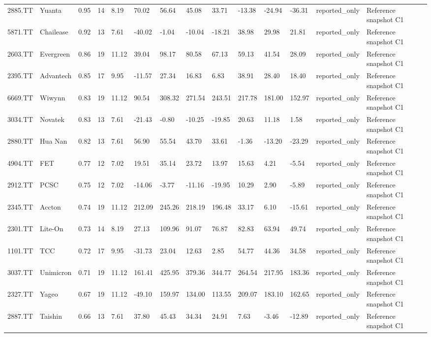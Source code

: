 \begin{landscape}
\begin{longtable}{llllllllllllll}
2885.TT & Yuanta & 0.95 & 14 & 8.19 & 70.02 & 56.64 & 45.08 & 33.71 & -13.38 & -24.94 & -36.31 & reported\_only & Reference snapshot C1 \\
5871.TT & Chailease & 0.92 & 13 & 7.61 & -40.02 & -1.04 & -10.04 & -18.21 & 38.98 & 29.98 & 21.81 & reported\_only & Reference snapshot C1 \\
2603.TT & Evergreen & 0.86 & 19 & 11.12 & 39.04 & 98.17 & 80.58 & 67.13 & 59.13 & 41.54 & 28.09 & reported\_only & Reference snapshot C1 \\
2395.TT & Advantech & 0.85 & 17 & 9.95 & -11.57 & 27.34 & 16.83 & 6.83 & 38.91 & 28.40 & 18.40 & reported\_only & Reference snapshot C1 \\
6669.TT & Wiwynn & 0.83 & 19 & 11.12 & 90.54 & 308.32 & 271.54 & 243.51 & 217.78 & 181.00 & 152.97 & reported\_only & Reference snapshot C1 \\
3034.TT & Novatek & 0.83 & 13 & 7.61 & -21.43 & -0.80 & -10.25 & -19.85 & 20.63 & 11.18 & 1.58 & reported\_only & Reference snapshot C1 \\
2880.TT & Hua Nan & 0.82 & 13 & 7.61 & 56.90 & 55.54 & 43.70 & 33.61 & -1.36 & -13.20 & -23.29 & reported\_only & Reference snapshot C1 \\
4904.TT & FET & 0.77 & 12 & 7.02 & 19.51 & 35.14 & 23.72 & 13.97 & 15.63 & 4.21 & -5.54 & reported\_only & Reference snapshot C1 \\
2912.TT & PCSC & 0.75 & 12 & 7.02 & -14.06 & -3.77 & -11.16 & -19.95 & 10.29 & 2.90 & -5.89 & reported\_only & Reference snapshot C1 \\
2345.TT & Accton & 0.74 & 19 & 11.12 & 212.09 & 245.26 & 218.19 & 196.48 & 33.17 & 6.10 & -15.61 & reported\_only & Reference snapshot C1 \\
2301.TT & Lite-On & 0.73 & 14 & 8.19 & 27.13 & 109.96 & 91.07 & 76.87 & 82.83 & 63.94 & 49.74 & reported\_only & Reference snapshot C1 \\
1101.TT & TCC & 0.72 & 17 & 9.95 & -31.73 & 23.04 & 12.63 & 2.85 & 54.77 & 44.36 & 34.58 & reported\_only & Reference snapshot C1 \\
3037.TT & Unimicron & 0.71 & 19 & 11.12 & 161.41 & 425.95 & 379.36 & 344.77 & 264.54 & 217.95 & 183.36 & reported\_only & Reference snapshot C1 \\
2327.TT & Yageo & 0.67 & 19 & 11.12 & -49.10 & 159.97 & 134.00 & 113.55 & 209.07 & 183.10 & 162.65 & reported\_only & Reference snapshot C1 \\
2887.TT & Taishin & 0.66 & 13 & 7.61 & 37.80 & 45.43 & 34.34 & 24.91 & 7.63 & -3.46 & -12.89 & reported\_only & Reference snapshot C1 \\

\end{longtable}
\end{landscape}
